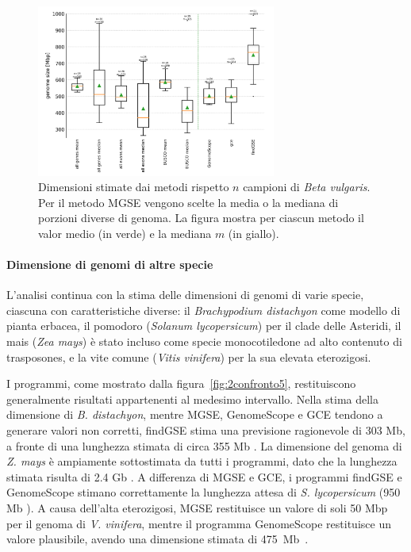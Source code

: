 \documentclass[crop=false, class=book]{standalone}
\begin{document}
	\begin{figure}[]
		\centering
		\includegraphics[width=0.7\textwidth]{capitoli/analisi/confronto/confronto2/3.png}
		\caption{Dimensioni stimate dai metodi rispetto $n$ campioni di \textit{Beta vulgaris}. Per il metodo MGSE vengono scelte la media o la mediana di porzioni diverse di genoma. La figura mostra per ciascun metodo il valor medio (in verde) e la mediana $m$ (in giallo).}
		\label{fig:2confronto4}
	\end{figure} 

	\paragraph{Dimensione di genomi di altre specie}
	L'analisi continua con la stima delle dimensioni di genomi di varie specie, ciascuna con caratteristiche diverse: il \textit{Brachypodium distachyon} come modello di pianta erbacea, il pomodoro (\textit{Solanum lycopersicum}) per il \gls{clade} delle Asteridi, il mais (\textit{Zea mays}) è stato incluso come specie monocotiledone ad alto contenuto di \glspl{trasposone}, e la vite comune (\textit{Vitis vinifera}) per la sua elevata eterozigosi.
	
	I programmi, come mostrato dalla figura~\vref{fig:2confronto5}, restituiscono generalmente risultati appartenenti al medesimo intervallo. Nella stima della dimensione di \textit{B. distachyon}, mentre MGSE, GenomeScope e GCE tendono a generare valori non corretti, findGSE stima una previsione ragionevole di 303 Mb, a fronte di una lunghezza stimata di circa 355 Mb \cite{ozdemir2008brachypodium}. 
	La dimensione del genoma di \textit{Z. mays} è ampiamente sottostimata da tutti i programmi, dato che la lunghezza stimata risulta di 2.4 Gb \cite{haberer2005structure}. 
	A differenza di MGSE e GCE, i programmi findGSE e GenomeScope stimano correttamente la lunghezza attesa di \textit{S. lycopersicum} (950 Mb \cite{barone2008structural}).	
	A causa dell'alta eterozigosi, MGSE restituisce un valore di soli 50 Mbp per il genoma di \textit{V. vinifera}, mentre il programma GenomeScope restituisce un valore plausibile, avendo una dimensione stimata di 475~Mb~\cite{myles2010rapid}.
\end{document}
